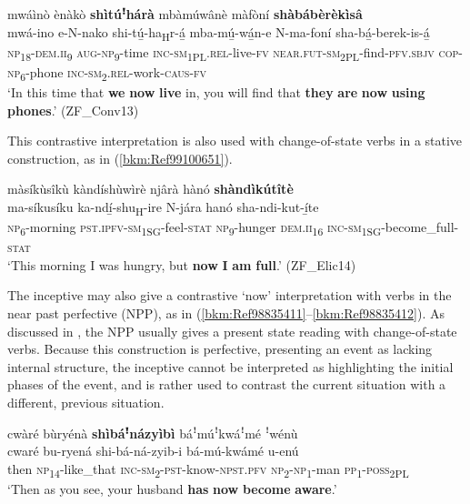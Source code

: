 \ea
\label{bkm:Ref506303056}
mwáìnò ènàkò \textbf{shìtúꜝ}\textbf{hárà} mbàmúwânè màfòní \textbf{shàbábèrèkìsâ}\\
\gll mwá-ino  e-N-nako    shi-tú̲-ha\textsubscript{H}r-á̲ mba-mú̲-wá̲n-e N-ma-foní    sha-bá̲-berek-is-á̲ \\
\textsc{np}\textsubscript{18}-\textsc{dem}.\textsc{ii}\textsubscript{9}  \textsc{aug}-\textsc{np}\textsubscript{9}-time  \textsc{inc}-\textsc{sm}\textsubscript{1PL}.\textsc{rel}\textsubscript{\-}-live-\textsc{fv}
\textsc{near}.\textsc{fut}-\textsc{sm}\textsubscript{2PL}-find-\textsc{pfv}.\textsc{sbjv}
\textsc{cop}-\textsc{np}\textsubscript{6}-phone  \textsc{inc}-\textsc{sm}\textsubscript{2}.\textsc{rel}-work-\textsc{caus}-\textsc{fv}\\
\glt ‘In this time that \textbf{we} \textbf{now} \textbf{live} in, you will find that \textbf{they} \textbf{are} \textbf{now} \textbf{using} \textbf{phones}.’ (ZF\_Conv13)
\z

This contrastive interpretation is also used with change-of-state verbs in a stative construction, as in (\ref{bkm:Ref99100651}).

\ea
\label{bkm:Ref99100651}
màsíkùsîkù kàndíshùwìrè njârà hànó \textbf{shàndìkútîtè}\\
\gll ma-síkusíku  ka-ndí̲-shu\textsubscript{H}-ire    N-jára hanó    sha-ndi-kut-í̲te\\
\textsc{np}\textsubscript{6}-morning  \textsc{pst}.\textsc{ipfv}-\textsc{sm}\textsubscript{1SG}-feel-\textsc{stat}  \textsc{np}\textsubscript{9}-hunger
\textsc{dem}.\textsc{ii}\textsubscript{16}  \textsc{inc}-\textsc{sm}\textsubscript{1SG}-become\_full-\textsc{stat}\\
\glt ‘This morning I was hungry, but \textbf{now} \textbf{I} \textbf{am} \textbf{full}.’ (ZF\_Elic14)
\z

The inceptive may also give a contrastive ‘now’ interpretation with verbs in the near past perfective (NPP), as in (\ref{bkm:Ref98835411}--\ref{bkm:Ref98835412}). As discussed in , the NPP usually gives a present state reading with change-of-state verbs. Because this construction is perfective, presenting an event as lacking internal structure, the inceptive cannot be interpreted as highlighting the initial phases of the event, and is rather used to contrast the current situation with a different, previous situation.

\ea
\label{bkm:Ref98835411}
cwàré bùryénà \textbf{shìbáꜝ}\textbf{názyìbì} báꜝmúꜝkwáꜝmé ꜝwénù\\
\gll cwaré  bu-ryená    shi-bá-ná-zyib-i  bá-mú-kwámé  u-enú \\
then  \textsc{np}\textsubscript{14}-like\_that  \textsc{inc}-\textsc{sm}\textsubscript{2}-\textsc{pst}-know-\textsc{npst}.\textsc{pfv}
\textsc{np}\textsubscript{2}-\textsc{np}\textsubscript{1}-man  \textsc{pp}\textsubscript{1}-\textsc{poss}\textsubscript{2PL}\\
\glt ‘Then as you see, your husband \textbf{has} \textbf{now} \textbf{become} \textbf{aware}.’
\z

